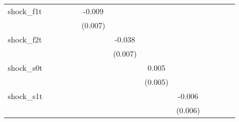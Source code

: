 {\begin{tabular}{l*{12}{c}}
\addlinespace
shock\_f1t   &                     &                     &                     &                     &      -0.009         &                     &                     &                     &                     &                     &                     &                     \\
            &                     &                     &                     &                     &     (0.007)         &                     &                     &                     &                     &                     &                     &                     \\
\addlinespace
shock\_f2t   &                     &                     &                     &                     &                     &      -0.038\sym{***}&                     &                     &                     &                     &                     &                     \\
            &                     &                     &                     &                     &                     &     (0.007)         &                     &                     &                     &                     &                     &                     \\
\addlinespace
shock\_s0t   &                     &                     &                     &                     &                     &                     &       0.005         &                     &                     &                     &                     &                     \\
            &                     &                     &                     &                     &                     &                     &     (0.005)         &                     &                     &                     &                     &                     \\
\addlinespace
shock\_s1t   &                     &                     &                     &                     &                     &                     &                     &      -0.006         &                     &                     &                     &                     \\
            &                     &                     &                     &                     &                     &                     &                     &     (0.006)         &                     &                     &                     &                     \\

\end{tabular}}
